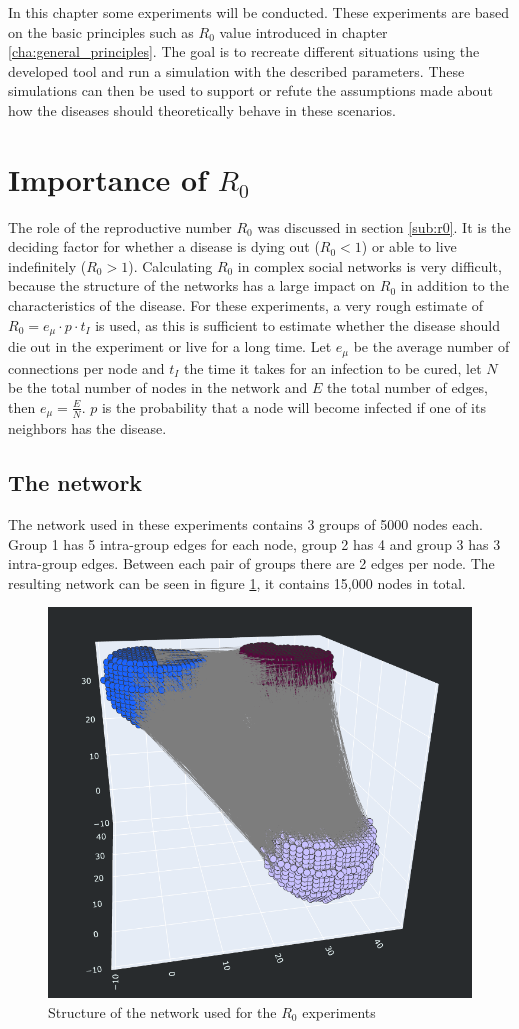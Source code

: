 In this chapter some experiments will be conducted. These experiments are based on the basic principles such as $R_0$ value introduced in chapter \ref{cha:general_principles}. The goal is to recreate different situations using the developed tool and run a simulation with the described parameters. These simulations can then be used to support or refute the assumptions made about how the diseases should theoretically behave in these scenarios.

\section{Importance of $R_0$}
The role of the reproductive number $R_0$ was discussed in section \ref{sub:r0}. It is the deciding factor for whether a disease is dying out ($R_0 < 1$) or able to live indefinitely ($R_0 > 1$). Calculating $R_0$ in complex social networks is very difficult, because the structure of the networks has a large impact on $R_0$ in addition to the characteristics of the disease. For these experiments, a very rough estimate of $R_0=e_\mu \cdot p \cdot t_I$ is used, as this is sufficient to estimate whether the disease should die out in the experiment or live for a long time. Let $e_\mu$ be the average number of connections per node and $t_I$ the time it takes for an infection to be cured, let $N$ be the total number of nodes in the network and $E$ the total number of edges, then $e_\mu=\frac{E}{N}$. $p$ is the probability that a node will become infected if one of its neighbors has the disease.

\subsection{The network}
\label{sub:exp_network}
The network used in these experiments contains 3 groups of 5000 nodes each. Group 1 has 5 intra-group edges for each node, group 2 has 4 and group 3 has 3 intra-group edges. Between each pair of groups there are 2 edges per node. The resulting network can be seen in figure \ref{fig:exp_r0_network}, it contains 15,000 nodes in total.

\begin{figure}
    \centering
    \includegraphics[width=0.5\linewidth]{images/experiment_r0_network.png}
    \caption{Structure of the network used for the $R_0$ experiments}
    \label{fig:exp_r0_network}
\end{figure}

